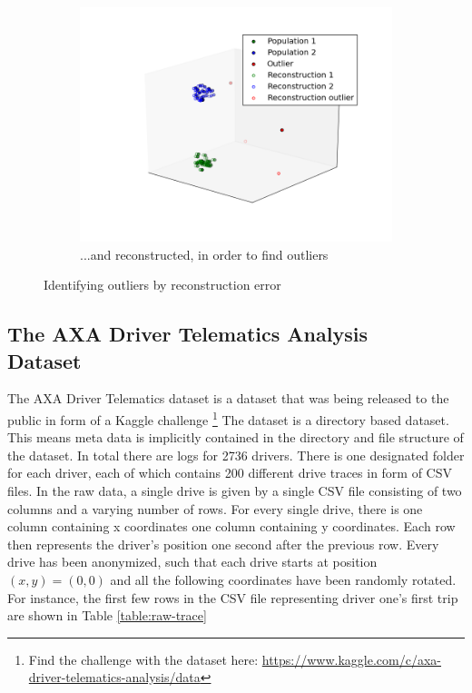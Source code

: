\documentclass{vldb}
\begin{document}
\begin{figure}
\begin{subfigure}{.5\textwidth}
  \centering
  \includegraphics[width=.9\linewidth]{"pics/reconstruction"}
  \caption{...and reconstructed, in order to find outliers}
  \label{subfig:reduction-c}
\end{subfigure}
\caption{Identifying outliers by reconstruction error}
\label{fig:auto-encoder-reconstruction}
\end{figure}

\subsection{The AXA Driver Telematics Analysis \\Dataset}
\label{subsec:Metho-dataset}
The AXA Driver Telematics dataset is a dataset that was being released to the public in form of a Kaggle challenge 
\footnote{Find the challenge with the dataset here: \url{https://www.kaggle.com/c/axa-driver-telematics-analysis/data}}
The dataset is a directory based dataset. This means meta data is implicitly contained in the directory and file structure of the dataset. In total there are logs for 2736 drivers. There is one designated folder for each driver, each of which contains 200 different drive traces in form of CSV files. In the raw data, a single drive is given by a single CSV file consisting of two columns and a varying number of rows. For every single drive, there is one column containing x coordinates one column containing y coordinates. Each row then represents the driver's position one second after the previous row. Every drive has been anonymized, such that each drive starts at position $(x, y) = (0, 0)$ and all the following coordinates have been randomly rotated.\\ 
For instance, the first few rows in the CSV file representing driver one's first trip are shown in Table \ref{table:raw-trace}
\end{document}
